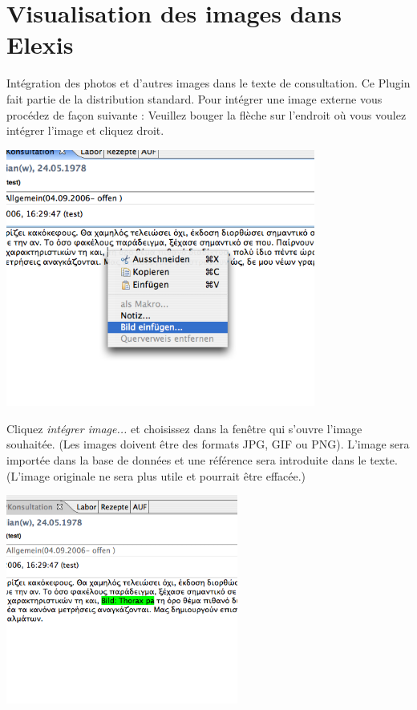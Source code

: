 \section{Visualisation des images dans Elexis}
Intégration des photos et d'autres images dans le texte de consultation. Ce Plugin fait partie de la distribution standard. Pour intégrer une image externe vous procédez de façon suivante :
Veuillez bouger la flèche sur l'endroit où vous voulez intégrer l'image et cliquez droit.

\includegraphics[width=4in]{images/bild1}


Cliquez \textit{intégrer image...} et choisissez dans la fenêtre qui s'ouvre l'image souhaitée. (Les images doivent être des formats JPG, GIF ou PNG). L'image sera importée dans la base de données et une référence sera introduite dans le texte.(L'image originale ne sera plus utile et pourrait être effacée.)

\includegraphics[width=3in]{images/bild2}



